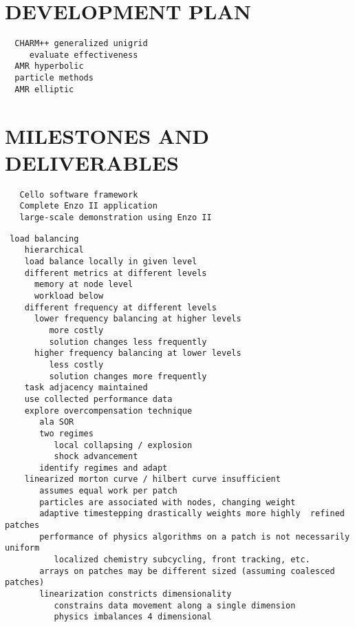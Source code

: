 \documentclass[14pt,letter]{article}
\begin{document}
\section{DEVELOPMENT PLAN} \label{s:plan}

\begin{verbatim}
  CHARM++ generalized unigrid
     evaluate effectiveness
  AMR hyperbolic
  particle methods
  AMR elliptic
\end{verbatim}

\section{MILESTONES AND DELIVERABLES} \label{s:milestones}

\begin{verbatim}
   Cello software framework
   Complete Enzo II application
   large-scale demonstration using Enzo II
\end{verbatim}




\begin{verbatim}
 load balancing
    hierarchical
    load balance locally in given level
    different metrics at different levels
      memory at node level
      workload below
    different frequency at different levels
      lower frequency balancing at higher levels
         more costly
         solution changes less frequently
      higher frequency balancing at lower levels
         less costly
         solution changes more frequently
    task adjacency maintained
    use collected performance data
    explore overcompensation technique
       ala SOR
       two regimes
          local collapsing / explosion
          shock advancement
       identify regimes and adapt
    linearized morton curve / hilbert curve insufficient
       assumes equal work per patch
       particles are associated with nodes, changing weight
       adaptive timestepping drastically weights more highly  refined patches
       performance of physics algorithms on a patch is not necessarily uniform
          localized chemistry subcycling, front tracking, etc.
       arrays on patches may be different sized (assuming coalesced patches)
       linearization constricts dimensionality
          constrains data movement along a single dimension
          physics imbalances 4 dimensional
\end{verbatim}
\end{document}
